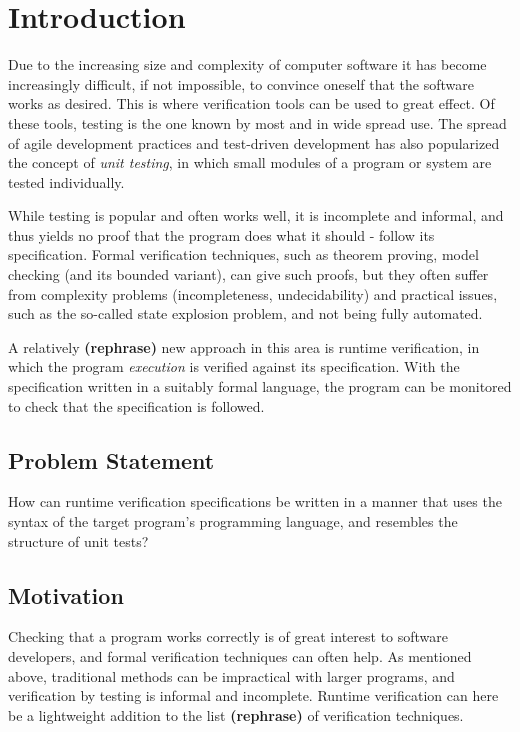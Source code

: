 \documentclass[a4paper,11pt]{kth-mag}
\newcommand{\rephrase}{\textbf{(rephrase)} }
\begin{document}
\pagestyle{newchap}
\chapter{Introduction} \label{chapter-introduction}

Due to the increasing size and complexity of computer software it has become
increasingly difficult, if not impossible, to convince oneself that the
software works as desired. This is where verification tools can be used to
great effect. Of these tools, testing is the one known by most and in wide
spread use.  The spread of agile development practices and test-driven
development has also popularized the concept of \textit{unit testing}, in which
small modules of a program or system are tested individually.

While testing is popular and often works well, it is incomplete and informal,
and thus yields no proof that the program does what it should - follow its
specification. Formal verification techniques, such as theorem proving, model
checking (and its bounded variant), can give such proofs, but they often suffer
from complexity problems (incompleteness, undecidability) and practical issues,
such as the so-called state explosion problem, and not being fully automated.

A relatively \rephrase new approach in this area is runtime verification, in
which the program \textit{execution} is verified against its specification.
With the specification written in a suitably formal language, the program can
be monitored to check that the specification is followed.


\section{Problem Statement} \label{section-problem-statement}

How can runtime verification specifications be written in a manner that uses
the syntax of the target program's programming language, and resembles
the structure of unit tests?

\section{Motivation}

Checking that a program works correctly is of great interest to software
developers, and formal verification techniques can often help. As mentioned
above, traditional methods can be impractical with larger programs, and
verification by testing is informal and incomplete. Runtime verification can
here be a lightweight addition to the list \rephrase of verification
techniques.
\end{document}

